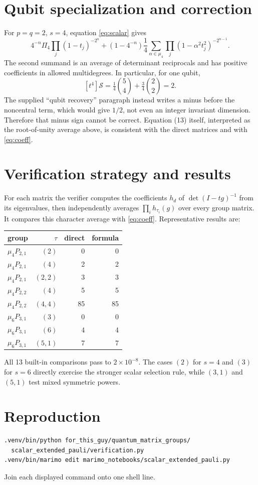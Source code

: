 \documentclass[11pt]{article}
\newcommand{\Sgm}{\mathcal S}
\begin{document}
\section{Qubit specialization and correction}
For $p=q=2$, $s=4$, equation \eqref{eq:scalar} gives
\[
4^{-n}\Pi_4\prod_j(1-t_j)^{-2^n}
+(1-4^{-n})\frac14\sum_{\alpha\in\mu_4}
\prod_j(1-\alpha^2t_j^2)^{-2^{n-1}}.
\]
The second summand is an average of determinant reciprocals and has positive
coefficients in allowed multidegrees.  In particular, for one qubit,
\[
[t^4]\Sgm=\tfrac14\binom{5}{4}+\tfrac34\binom{2}{2}=2.
\]
The supplied “qubit recovery” paragraph instead writes a minus before the
noncentral term, which would give $1/2$, not even an integer invariant
dimension.  Therefore that minus sign cannot be correct.  Equation (13)
itself, interpreted as the root-of-unity average above, is consistent with
the direct matrices and with \eqref{eq:coeff}.

\section{Verification strategy and results}
For each matrix the verifier computes the coefficients $h_d$ of
$\det(I-tg)^{-1}$ from its eigenvalues, then independently averages
$\prod_i h_{\tau_i}(g)$ over every group matrix.  It compares this character
average with \eqref{eq:coeff}.  Representative results are:
\begin{center}
\begin{tabular}{@{}lrrr@{}}\toprule
group & $\tau$ & direct & formula\\\midrule
$\mu_4P_{2,1}$ & $(2)$&0&0\\
$\mu_4P_{2,1}$ & $(4)$&2&2\\
$\mu_4P_{2,1}$ & $(2,2)$&3&3\\
$\mu_4P_{2,2}$ & $(4)$&5&5\\
$\mu_4P_{2,2}$ & $(4,4)$&85&85\\
$\mu_6P_{3,1}$ & $(3)$&0&0\\
$\mu_6P_{3,1}$ & $(6)$&4&4\\
$\mu_6P_{3,1}$ & $(5,1)$&7&7\\\bottomrule
\end{tabular}
\end{center}
All 13 built-in comparisons pass to $2\times10^{-8}$.  The cases $(2)$ for
$s=4$ and $(3)$ for $s=6$ directly exercise the stronger scalar selection
rule, while $(3,1)$ and $(5,1)$ test mixed symmetric powers.

\section{Reproduction}
\begin{verbatim}
.venv/bin/python for_this_guy/quantum_matrix_groups/
  scalar_extended_pauli/verification.py
.venv/bin/marimo edit marimo_notebooks/scalar_extended_pauli.py
\end{verbatim}
Join each displayed command onto one shell line.
\end{document}
